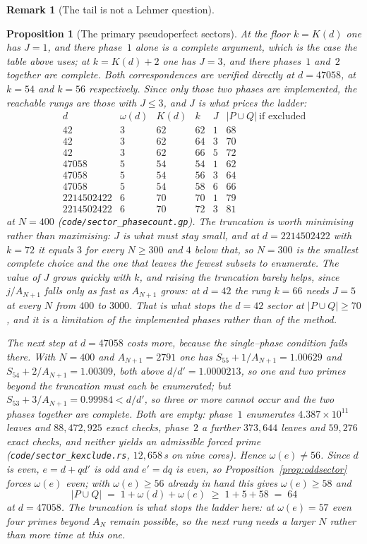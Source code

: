 \documentclass[11pt]{article}
\newtheorem{proposition}[theorem]{Proposition}
\theoremstyle{definition}
\newtheorem{remark}[theorem]{Remark}
\begin{document}
\begin{remark}[The tail is not a Lehmer question]
\begin{proposition}[The primary pseudoperfect sectors]
At the floor $k=K(d)$ one has $J=1$, and there phase~$1$ alone is a complete argument, which is the
case the table above uses; at $k=K(d)+2$ one has $J=3$, and there phases~$1$ and~$2$ together are
complete. Both correspondences are verified directly at $d=47058$, at $k=54$ and $k=56$ respectively.
Since only those two phases are implemented, the reachable rungs are those with $J\le3$, and $J$ is
what prices the ladder:
\[\begin{array}{lrrrrr}
d & \omega(d) & K(d) & k & J & |P\cup Q|\ \text{if excluded}\\[2pt]
42 & 3 & 62 & 62 & 1 & 68\\
42 & 3 & 62 & 64 & 3 & 70\\
42 & 3 & 62 & 66 & 5 & 72\\
47058 & 5 & 54 & 54 & 1 & 62\\
47058 & 5 & 54 & 56 & 3 & 64\\
47058 & 5 & 54 & 58 & 6 & 66\\
2214502422 & 6 & 70 & 70 & 1 & 79\\
2214502422 & 6 & 70 & 72 & 3 & 81
\end{array}\]
at $N=400$ \textup{(\texttt{code/sector\_phasecount.gp})}. The truncation is worth minimising rather
than maximising: $J$ is what must stay small, and at $d=2214502422$ with $k=72$ it equals $3$ for every
$N\ge300$ and $4$ below that, so $N=300$ is the smallest complete choice and the one that leaves the
fewest subsets to enumerate. The value of $J$ grows quickly with $k$, and
raising the truncation barely helps, since $j/A_{N+1}$ falls only as fast as $A_{N+1}$ grows: at
$d=42$ the rung $k=66$ needs $J=5$ at every $N$ from $400$ to $3000$. That is what stops the $d=42$
sector at $|P\cup Q|\ge70$, and it is a limitation of the implemented phases rather than of the
method.

The next step at $d=47058$ costs more, because the single--phase condition fails there. With
$N=400$ and $A_{N+1}=2791$ one has $S_{55}+1/A_{N+1}=1.00629$ and $S_{54}+2/A_{N+1}=1.00309$, both
above $d/d'=1.0000213$, so one and two primes beyond the truncation must each be enumerated; but
$S_{53}+3/A_{N+1}=0.99984<d/d'$, so three or more cannot occur and the two phases together are
complete. Both are empty: phase~$1$ enumerates $4.387\times10^{11}$ leaves and $88{,}472{,}925$ exact
checks, phase~$2$ a further $373{,}644$ leaves and $59{,}276$ exact checks, and neither yields an
admissible forced prime \textup{(\texttt{code/sector\_kexclude.rs}, $12{,}658$\,s on nine cores)}.
Hence $\omega(e)\ne56$. Since $d$ is even, $e=d+qd'$ is odd and $e'=dq$ is even, so
Proposition~\ref{prop:oddsector} forces $\omega(e)$ even; with $\omega(e)\ge56$ already in hand this
gives $\omega(e)\ge58$ and
\[ |P\cup Q|\;=\;1+\omega(d)+\omega(e)\;\ge\;1+5+58\;=\;64 \]
at $d=47058$. The truncation is what stops the ladder here: at $\omega(e)=57$ even four primes beyond
$A_N$ remain possible, so the next rung needs a larger $N$ rather than more time at this one.
\end{proposition}


\end{remark}
\end{document}
